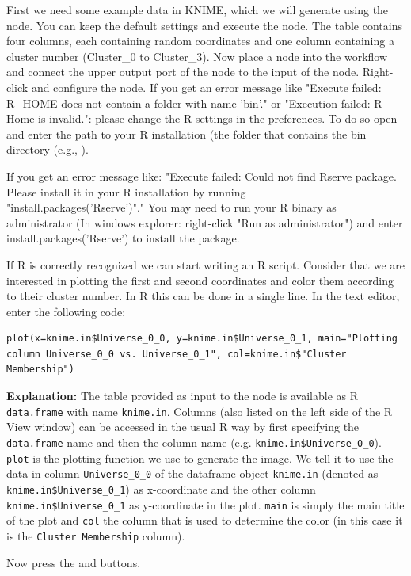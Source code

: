 \begin{task}
First we need some example data in KNIME, which we will generate using the  node. You can 
keep the default settings and execute the node. The table contains four columns, each containing random coordinates 
and one column containing a cluster number (Cluster\_0 to Cluster\_3). Now place a  node 
into the workflow and connect the upper output port of the  node to the input of the 
 node. Right-click and configure the node.
If you get an error message like "Execute failed: R\_HOME does not contain a folder with name 'bin'." or "Execution 
failed: R Home is invalid.": please change the R settings in the preferences. To do so open  and enter the path to your R installation (the folder that contains the bin directory (e.g., ).

If you get an error message like:
"Execute failed: Could not find Rserve package. Please install it in your R installation by running \\ 
"install.packages('Rserve')"." You may need to run your R binary as administrator (In windows explorer: right-click 
"Run as administrator") and enter install.packages('Rserve') to install the package.

If R is correctly recognized we can start writing an R script. Consider that we are interested in plotting the first 
and second coordinates and color them according to their cluster number. In R this can be done in a single line.
In the  text editor, enter the following code:
\begin{lstlisting}
plot(x=knime.in$Universe_0_0, y=knime.in$Universe_0_1, main="Plotting column Universe_0_0 vs. Universe_0_1", col=knime.in$"Cluster Membership")
\end{lstlisting}
        
\textbf{Explanation:}
The table provided as input to the  node is available as R \texttt{data.frame} with name 
\texttt{knime.in}. Columns (also listed on the left side of the R View window) can be accessed in the usual R way by 
first specifying the \texttt{data.frame} name and then the column name (e.g. \texttt{knime.in\$Universe\_0\_0}).
\texttt{plot} is the plotting function we use to generate the image. We tell it to use the data in column 
\texttt{Universe\_0\_0} of the dataframe object \texttt{knime.in} (denoted as \texttt{knime.in\$Universe\_0\_1}) as 
x-coordinate and the other column \texttt{knime.in\$Universe\_0\_1} as y-coordinate in the plot. \texttt{main} is 
simply the main title of the plot and \texttt{col} the column that is used to determine the color (in this case it is 
the \texttt{Cluster Membership} column).

Now press the  and  buttons.
\end{task}

